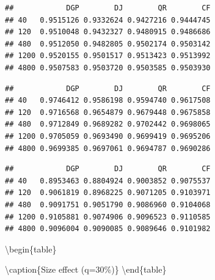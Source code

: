 \documentclass[
]{article}
\begin{document}
\begin{verbatim}
##            DGP        DJ        QR        CF
## 40   0.9515126 0.9332624 0.9427216 0.9444745
## 120  0.9510048 0.9432327 0.9480915 0.9486686
## 480  0.9512050 0.9482805 0.9502174 0.9503142
## 1200 0.9520155 0.9501517 0.9513423 0.9513992
## 4800 0.9507583 0.9503720 0.9503585 0.9503930
\end{verbatim}

\begin{verbatim}
##            DGP        DJ        QR        CF
## 40   0.9746412 0.9586198 0.9594740 0.9617508
## 120  0.9716568 0.9654879 0.9679448 0.9675858
## 480  0.9712849 0.9689282 0.9702442 0.9698065
## 1200 0.9705059 0.9693490 0.9699419 0.9695206
## 4800 0.9699385 0.9697061 0.9694787 0.9690286
\end{verbatim}

\begin{verbatim}
##            DGP        DJ        QR        CF
## 40   0.8953463 0.8804924 0.9003852 0.9075537
## 120  0.9061819 0.8968225 0.9071205 0.9103971
## 480  0.9091751 0.9051790 0.9086960 0.9104068
## 1200 0.9105881 0.9074906 0.9096523 0.9110585
## 4800 0.9096004 0.9090085 0.9089646 0.9101982
\end{verbatim}

\textbackslash begin\{table\}

\textbackslash caption\{\label{tab:size0.3}Size effect (q=30\%)\}
\centering {} \textbackslash end\{table\}
\end{document}
